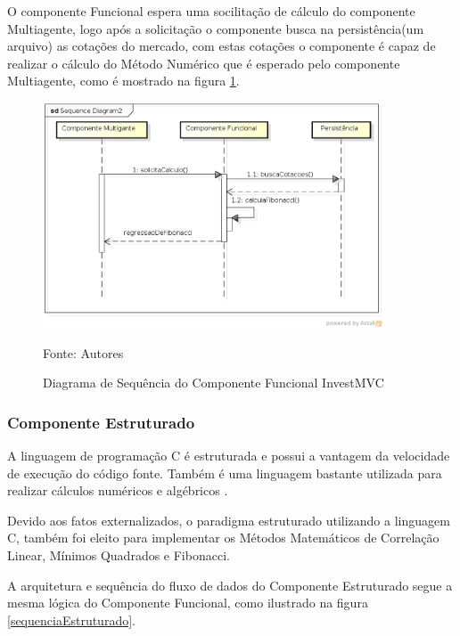 O componente Funcional espera uma socilitação de cálculo do componente Multiagente, logo após a solicitação o componente busca na persistência(um arquivo) as cotações do mercado, com estas cotações o componente é capaz de realizar o cálculo do Método Numérico que é esperado pelo componente Multiagente, como é mostrado na figura \ref{sequenciaFuncional}.

\begin{figure}[htp]
\centering
\includegraphics[width=0.9\textwidth]{figuras/sequenciaFuncional}
\caption{Diagrama de Sequência do Componente Funcional InvestMVC}{Fonte: Autores} 
\label{sequenciaFuncional}
\end{figure}

\subsubsection{Componente Estruturado}

A linguagem de programação C é estruturada e possui a vantagem da velocidade de execução do código fonte. Também é uma linguagem bastante utilizada para realizar cálculos numéricos e algébricos \cite{gustavo}. 

Devido aos fatos externalizados, o paradigma estruturado utilizando a linguagem C, também foi eleito para implementar os Métodos Matemáticos de Correlação Linear, Mínimos Quadrados e Fibonacci.

A arquitetura e sequência do fluxo de dados do Componente Estruturado segue a mesma lógica do Componente Funcional, como ilustrado na figura \ref{sequenciaEstruturado}.

